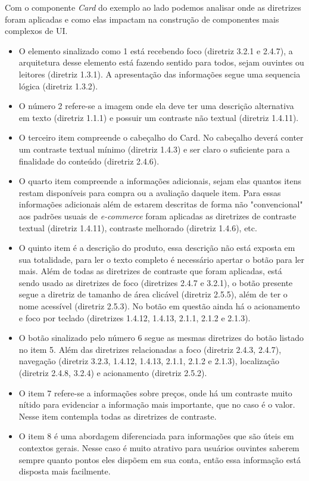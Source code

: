 {Com o componente \textit{Card} do exemplo ao lado podemos analisar onde as diretrizes foram aplicadas e como elas impactam na construção de componentes mais complexos de UI. 
\begin{itemize}
\item O elemento sinalizado como 1 está recebendo foco (diretriz 3.2.1 e 2.4.7), a arquitetura desse elemento está fazendo sentido para todos, sejam ouvintes ou leitores (diretriz 1.3.1). A apresentação das informações segue uma sequencia lógica (diretriz 1.3.2).  
\item O número 2 refere-se a imagem onde ela deve ter uma descrição alternativa em texto (diretriz 1.1.1) e possuir um contraste não textual (diretriz 1.4.11).
\item O terceiro item compreende o cabeçalho do Card. No cabeçalho deverá conter um contraste textual mínimo (diretriz 1.4.3) e ser claro o suficiente para a finalidade do conteúdo (diretriz 2.4.6).
\item O quarto item compreende a informações adicionais, sejam elas quantos itens restam disponíveis para compra ou a avaliação daquele item. Para essas informações adicionais além de estarem descritas de forma não "convencional" aos padrões usuais de \textit{e-commerce} foram aplicadas as diretrizes de contraste textual (diretriz 1.4.11), contraste melhorado (diretriz 1.4.6), etc.
\end{itemize}
\newpage
\begin{itemize}
\item O quinto item é a descrição do produto, essa descrição não está exposta em sua totalidade, para ler o texto completo é necessário apertar o botão para ler mais. Além de todas as diretrizes de contraste que foram aplicadas, está sendo usado as diretrizes de foco (diretrizes 2.4.7 e 3.2.1), o botão presente segue a diretriz de tamanho de área clicável (diretriz 2.5.5), além de ter o nome acessível (diretriz 2.5.3). No botão em questão ainda há o acionamento e foco por teclado (diretrizes 1.4.12, 1.4.13, 2.1.1, 2.1.2 e 2.1.3). 
\item O botão sinalizado pelo número 6 segue as mesmas diretrizes do botão listado no item 5. Além das diretrizes relacionadas a foco (diretriz 2.4.3, 2.4.7), navegação (diretriz 3.2.3, 1.4.12, 1.4.13, 2.1.1, 2.1.2 e 2.1.3), localização (diretriz 2.4.8, 3.2.4) e acionamento (diretriz 2.5.2).
\item O item 7 refere-se a informações sobre preços, onde há um contraste muito nítido para evidenciar a informação mais importante, que no caso é o valor. Nesse item contempla todas as diretrizes de contraste. 
\item O item 8 é uma abordagem diferenciada para informações que são úteis em contextos gerais. Nesse caso é muito atrativo para usuários ouvintes saberem sempre quanto pontos eles dispõem em sua conta, então essa informação está disposta mais facilmente. 
\end{itemize}

}


